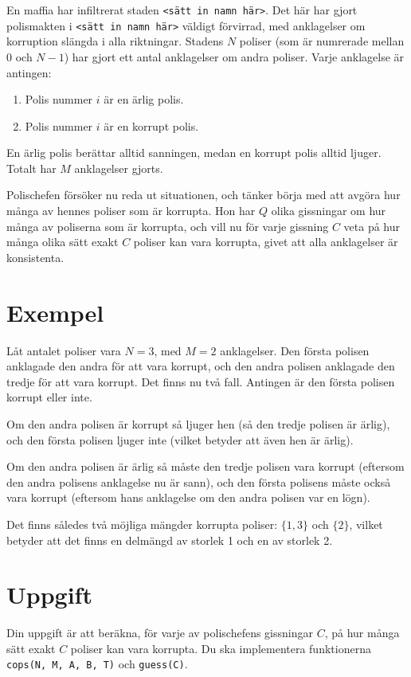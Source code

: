 \newcommand\version{v1}
En maffia har infiltrerat staden \texttt{<sätt in namn här>}.
Det här har gjort polismakten i \texttt{<sätt in namn här>} väldigt förvirrad, med anklagelser om korruption slängda i alla riktningar.
Stadens $N$ poliser (som är numrerade mellan $0$ och $N - 1$) har gjort ett antal anklagelser om andra poliser.
Varje anklagelse är antingen:
\begin{enumerate}
  \item Polis nummer $i$ är en ärlig polis.
  \item Polis nummer $i$ är en korrupt polis.
\end{enumerate}
En ärlig polis berättar alltid sanningen, medan en korrupt polis alltid ljuger.
Totalt har $M$ anklagelser gjorts.

Polischefen försöker nu reda ut situationen, och tänker börja med att avgöra hur många
av hennes poliser som är korrupta. Hon har $Q$ olika gissningar om hur många av poliserna som
är korrupta, och vill nu för varje gissning $C$ veta på hur många olika sätt exakt $C$ poliser kan vara korrupta,
givet att alla anklagelser är konsistenta.

\section*{Exempel}
Låt antalet poliser vara $N = 3$, med $M = 2$ anklagelser.
Den första polisen anklagade den andra för att vara korrupt, och den andra polisen anklagade den tredje för att vara korrupt. Det finns nu två fall. Antingen är den första polisen korrupt eller inte.

Om den andra polisen är korrupt så ljuger hen (så den tredje polisen är ärlig), och den första polisen ljuger inte (vilket betyder att även hen är ärlig).

Om den andra polisen är ärlig så måste den tredje polisen vara korrupt (eftersom den andra polisens anklagelse nu är sann), och den första polisens måste också vara korrupt (eftersom hans anklagelse om den andra polisen var en lögn).

Det finns således två möjliga mängder korrupta poliser: $\{1, 3\}$ och $\{2\}$, vilket betyder att det finns en delmängd av storlek 1 och en av storlek 2.

\section*{Uppgift}
Din uppgift är att beräkna, för varje av polischefens gissningar $C$, på hur många sätt exakt $C$ poliser kan vara korrupta.
Du ska implementera funktionerna \texttt{cops(N, M, A, B, T)} och \texttt{guess(C)}.

